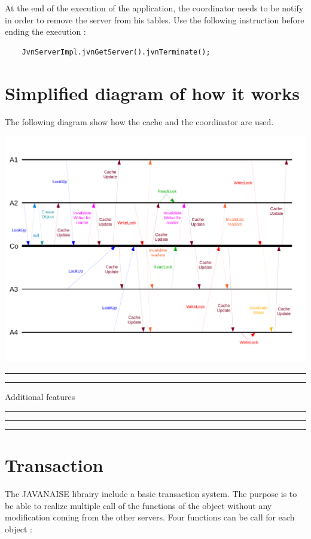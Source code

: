 \documentclass{article}
\begin{document}
At the end of the execution of the application, the coordinator needs to be notify in order to remove the server from his tables. Use the following instruction before ending the execution : \\

\noindent
\begin{verbatim}
    JvnServerImpl.jvnGetServer().jvnTerminate();
\end{verbatim}

\section{Simplified diagram of how it works}

The following diagram show how the cache and the coordinator are used.

\begin{center}
\includegraphics[width=16.85cm, clip, trim=0.4cm 1.5cm 0.6cm 2cm]{sch1}
\end{center}

\hrule\hrule \vspace{5mm}
\begin{huge}Additional features
\end{huge}
\vspace{5mm} \hrule\hrule\hrule

\section{Transaction}

The JAVANAISE librairy include a basic transaction system. The purpose is to be able to realize multiple call of the functions of the object without any modification coming from the other servers. Four functions can be call for each object :
\end{document}
